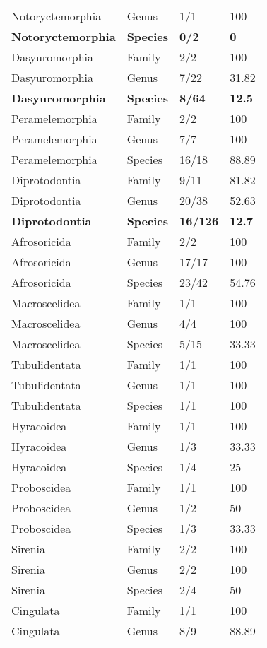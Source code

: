 \begin{longtable}{llll}
  Notoryctemorphia & Genus & 1/1 & 100 \\ 
  \textbf{Notoryctemorphia} & \textbf{Species} & \textbf{0/2} & \textbf{0} \\ 
  Dasyuromorphia & Family & 2/2 & 100 \\ 
  Dasyuromorphia & Genus & 7/22 & 31.82 \\ 
  \textbf{Dasyuromorphia} & \textbf{Species} & \textbf{8/64} & \textbf{12.5} \\ 
  Peramelemorphia & Family & 2/2 & 100 \\ 
  Peramelemorphia & Genus & 7/7 & 100 \\ 
  Peramelemorphia & Species & 16/18 & 88.89 \\ 
  Diprotodontia & Family & 9/11 & 81.82 \\ 
  Diprotodontia & Genus & 20/38 & 52.63 \\ 
  \textbf{Diprotodontia} & \textbf{Species} & \textbf{16/126} & \textbf{12.7} \\ 
  Afrosoricida & Family & 2/2 & 100 \\ 
  Afrosoricida & Genus & 17/17 & 100 \\ 
  Afrosoricida & Species & 23/42 & 54.76 \\ 
  Macroscelidea & Family & 1/1 & 100 \\ 
  Macroscelidea & Genus & 4/4 & 100 \\ 
  Macroscelidea & Species & 5/15 & 33.33 \\ 
  Tubulidentata & Family & 1/1 & 100 \\ 
  Tubulidentata & Genus & 1/1 & 100 \\ 
  Tubulidentata & Species & 1/1 & 100 \\ 
  Hyracoidea & Family & 1/1 & 100 \\ 
  Hyracoidea & Genus & 1/3 & 33.33 \\ 
  Hyracoidea & Species & 1/4 & 25 \\ 
  Proboscidea & Family & 1/1 & 100 \\ 
  Proboscidea & Genus & 1/2 & 50 \\ 
  Proboscidea & Species & 1/3 & 33.33 \\ 
  Sirenia & Family & 2/2 & 100 \\ 
  Sirenia & Genus & 2/2 & 100 \\ 
  Sirenia & Species & 2/4 & 50 \\ 
  Cingulata & Family & 1/1 & 100 \\ 
  Cingulata & Genus & 8/9 & 88.89 \\ 

\end{longtable}
